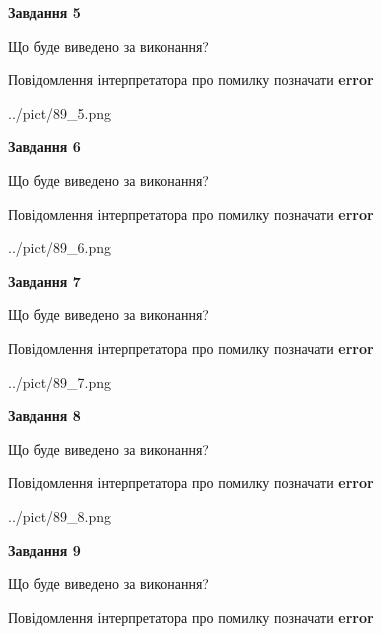 \documentclass[11pt, ukrainian]{article}
\begin{document}
{\begin {large}
{\begin {center}\textbf{Завдання 5}\end {center}}\par
Що буде виведено за виконання? \par
Повідомлення інтерпретатора про помилку позначати \textbf{error}

\begin{center}
	{../pict/89_5.png}
\end{center}
\newpage

{\begin {center}\textbf{Завдання 6}\end {center}}\par
Що буде виведено за виконання? \par
Повідомлення інтерпретатора про помилку позначати \textbf{error}

\begin{center}
	{../pict/89_6.png}
\end{center}
\newpage

{\begin {center}\textbf{Завдання 7}\end {center}}\par
Що буде виведено за виконання? \par
Повідомлення інтерпретатора про помилку позначати \textbf{error}

\begin{center}
	{../pict/89_7.png}
\end{center}
\newpage

{\begin {center}\textbf{Завдання 8}\end {center}}\par
Що буде виведено за виконання? \par
Повідомлення інтерпретатора про помилку позначати \textbf{error}

\begin{center}
	{../pict/89_8.png}
\end{center}
\newpage

{\begin {center}\textbf{Завдання 9}\end {center}}\par
Що буде виведено за виконання? \par
Повідомлення інтерпретатора про помилку позначати \textbf{error}


\end{large}}
\end{document}
